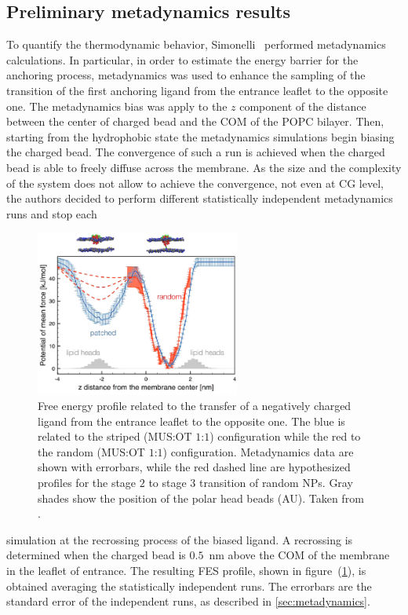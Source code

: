 \subsection{Preliminary metadynamics results}
\label{sec:preliminaryMetadyn}
To quantify the thermodynamic behavior, Simonelli \etal\, performed metadynamics calculations. In particular, in 
order to estimate the energy barrier for the anchoring process, metadynamics was used to enhance the sampling of 
the transition of the first anchoring ligand from the entrance leaflet to the opposite one. The metadynamics bias 
was apply to the $z$ component of the distance between the center of charged bead and the \ac{COM} of the 
\ac{POPC} bilayer. Then, starting from the hydrophobic state the metadynamics simulations begin biasing the 
charged bead. The convergence of such a run is achieved when the charged bead is able to freely diffuse across 
the membrane. As the size and the complexity of the system does not allow to achieve the convergence, not even at 
\ac{CG} level, the authors decided to perform different statistically independent metadynamics runs and stop each 
\begin{figure}[!b]
	\centering
	\includegraphics[width=0.6\textwidth]{./img/NPFES}
	\caption{Free energy profile related to the transfer of a negatively charged ligand from the entrance leaflet to the opposite one. The blue is related to the striped (\ac{MUS}:\ac{OT} $1$:$1$) configuration while the red to the random (\ac{MUS}:\ac{OT} $1$:$1$) configuration. Metadynamics data are shown with errorbars, while the red dashed line are hypothesized profiles for the stage $2$ to stage $3$ transition of random \acp{NP}. Gray shades show the position of the polar head beads (AU). Taken from \cite{ourPaper}.}
	\label{fig:NPFES}
\end{figure}
simulation at the recrossing process of the biased ligand. A recrossing is determined when the charged bead is 
$0.5$~nm above the \ac{COM} of the membrane in the leaflet of entrance. The resulting \ac{FES} profile, shown in 
figure~(\ref{fig:NPFES}), is obtained averaging the statistically independent runs. The errorbars are the 
standard error of the independent runs, as described in \ref{sec:metadynamics}.

